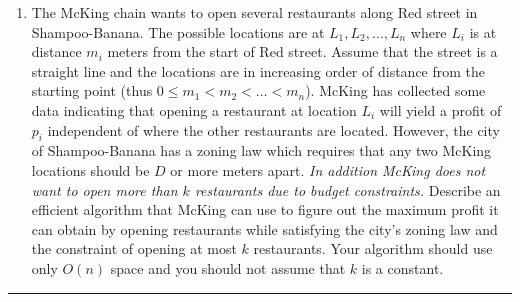 \documentclass[11pt]{article}
\begin{document}


\begin{enumerate}[$1$.]
\item The McKing chain wants to open several restaurants along Red
  street in Shampoo-Banana. The possible locations are at $L_1,L_2,
  \ldots, L_n$ where $L_i$ is at distance $m_i$ meters from the start
  of Red street. Assume that the street is a straight line and the
  locations are in increasing order of distance from the starting
  point (thus $0 \leq m_1 < m_2 < \ldots < m_n$). McKing has collected
  some data indicating that opening a restaurant at location $L_i$
  will yield a profit of $p_i$ independent of where the other
  restaurants are located. However, the city of Shampoo-Banana has a
  zoning law which requires that any two McKing locations should be
  $D$ or more meters apart. {\em In addition McKing does not want to
    open more than $k$ restaurants due to budget constraints.}
  Describe an efficient algorithm that McKing can use to figure out the maximum
  profit it can obtain by opening restaurants while satisfying the
  city's zoning law and the constraint of opening at most $k$
  restaurants.  Your algorithm should use only $O(n)$ space and you
  should not assume that $k$ is a constant.

\end{enumerate}

\hrule
\end{document}
